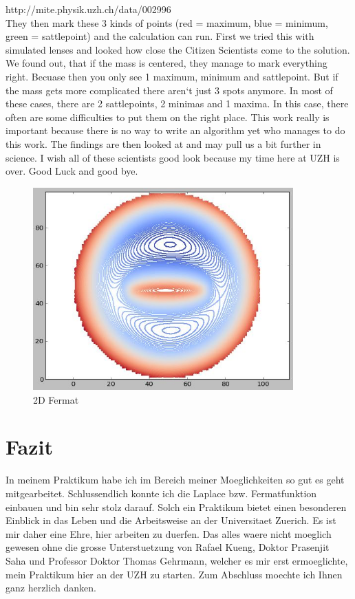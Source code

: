 \documentclass[pdftex,12pt,a4paper]{article}
\begin{document}
http://mite.physik.uzh.ch/data/002996
\\[0mm]
They then mark these 3 kinds of points (red = maximum, blue = minimum, green = sattlepoint) and the calculation can run. First we tried this with simulated lenses and looked how close the Citizen Scientists come to the solution. We found out, that if the mass is centered, they manage to mark everything right. Becuase then you only see 1 maximum, minimum and sattlepoint. But if the mass gets more complicated there aren`t just 3 spots anymore. In most of these cases, there are 2 sattlepoints, 2 minimas and 1 maxima. In this case, there often are some difficulties to put them on the right place. This work really is important because there is no way to write an algorithm yet who manages to do this work. The findings are then looked at and may pull us a bit further in science. I wish all of these scientists good look because my time here at UZH is over. Good Luck and good bye.

\begin{figure}[position=h]
\centering
 \caption{2D Fermat}
 \includegraphics[width=10cm]{Bilder/Fermat2}%
\end{figure}

\clearpage
\section{Fazit}
In meinem Praktikum habe ich im Bereich meiner Moeglichkeiten so gut es geht mitgearbeitet.
Schlussendlich konnte ich die Laplace bzw. Fermatfunktion einbauen und bin sehr stolz darauf.
Solch ein Praktikum bietet einen besonderen Einblick in das Leben und die Arbeitsweise an der Universitaet Zuerich.
Es ist mir daher eine Ehre, hier arbeiten zu duerfen.
Das alles waere nicht moeglich gewesen ohne die grosse Unterstuetzung von Rafael Kueng, Doktor Prasenjit Saha und Professor Doktor Thomas Gehrmann,
welcher es mir erst ermoeglichte, mein Praktikum hier an der UZH zu starten.
Zum Abschluss moechte ich Ihnen ganz herzlich danken.
\end{document}
